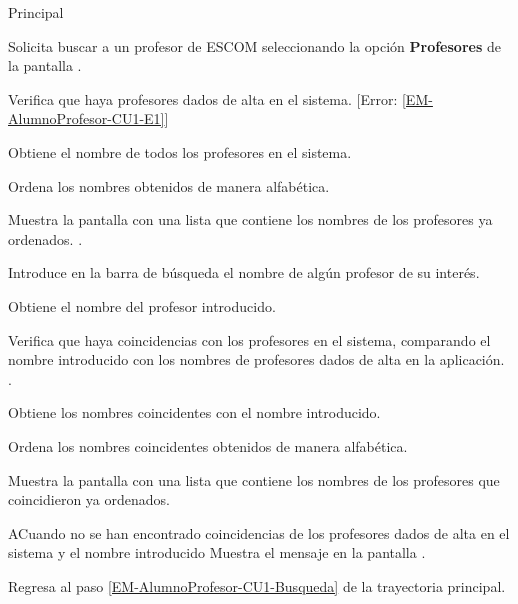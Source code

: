 \begin{UCtrayectoria}{Principal}

	\UCpaso [\UCactor] Solicita buscar a un profesor de ESCOM seleccionando la opción \textbf{Profesores} de la pantalla .

	\UCpaso Verifica que haya profesores dados de alta en el sistema. [Error: \ref{EM-AlumnoProfesor-CU1-E1}] 

	\UCpaso Obtiene el nombre de todos los profesores en el sistema. 

	\UCpaso Ordena los nombres obtenidos de manera alfabética. 

	\UCpaso Muestra la pantalla  con una lista que contiene los nombres de los profesores ya ordenados. \label{EM-AlumnoProfesor-CU1-Busqueda}.

	\UCpaso [\UCactor] Introduce en la barra de búsqueda el nombre de algún profesor de su interés. 

	\UCpaso Obtiene el nombre del profesor introducido.

	\UCpaso Verifica que haya coincidencias con los profesores en el sistema, comparando el nombre introducido con los nombres de profesores dados de alta en la aplicación. .

	\UCpaso Obtiene los nombres coincidentes con el nombre introducido.

	\UCpaso Ordena los nombres coincidentes obtenidos de manera alfabética. 

	\UCpaso Muestra la pantalla  con una lista que contiene los nombres de los profesores que coincidieron ya ordenados. 

\end{UCtrayectoria}

\begin{UCtrayectoriaA}{A}{Cuando no se han encontrado coincidencias de los profesores dados de alta en el sistema y el nombre introducido}
	\UCpaso Muestra el mensaje  en la pantalla .

	\UCpaso Regresa al paso \ref{EM-AlumnoProfesor-CU1-Busqueda} de la trayectoria principal.
\end{UCtrayectoriaA}




